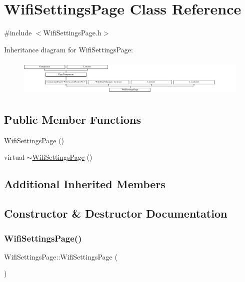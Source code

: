 \hypertarget{classWifiSettingsPage}{}\section{Wifi\+Settings\+Page Class Reference}
\label{classWifiSettingsPage}


{\ttfamily \#include $<$Wifi\+Settings\+Page.\+h$>$}

Inheritance diagram for Wifi\+Settings\+Page\+:\begin{figure}[H]
\begin{center}
\leavevmode
\includegraphics[height=1.792000cm]{classWifiSettingsPage}
\end{center}
\end{figure}
\subsection*{Public Member Functions}
\begin{DoxyCompactItemize}
\item 
\mbox{\hyperlink{classWifiSettingsPage_a604026ab957a489a701dc8b50df9600d}{Wifi\+Settings\+Page}} ()
\item 
virtual \mbox{\hyperlink{classWifiSettingsPage_ab8e7a083fc6dbe1ec18b08e037078846}{$\sim$\+Wifi\+Settings\+Page}} ()
\end{DoxyCompactItemize}
\subsection*{Additional Inherited Members}


\subsection{Constructor \& Destructor Documentation}
\mbox{\label{classWifiSettingsPage_a604026ab957a489a701dc8b50df9600d}} 
\subsubsection{\texorpdfstring{Wifi\+Settings\+Page()}{WifiSettingsPage()}}
{\footnotesize\ttfamily Wifi\+Settings\+Page\+::\+Wifi\+Settings\+Page (\begin{DoxyParamCaption}{ }\end{DoxyParamCaption})}

